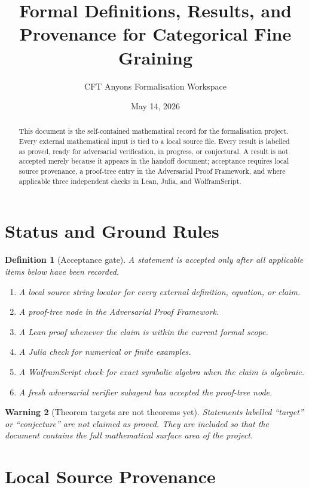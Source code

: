 \documentclass[11pt]{article}
\title{Formal Definitions, Results, and Provenance for Categorical Fine Graining}
\author{CFT Anyons Formalisation Workspace}
\date{May 14, 2026}
\newtheorem{definition}{Definition}[section]
\newtheorem{warning}[definition]{Warning}
\begin{document}
\maketitle

\begin{abstract}
This document is the self-contained mathematical record for the
formalisation project. Every external mathematical input is tied to a local
source file. Every result is labelled as proved, ready for adversarial
verification, in progress, or conjectural. A result is not accepted merely
because it appears in the handoff document; acceptance requires local source
provenance, a proof-tree entry in the Adversarial Proof Framework, and where
applicable three independent checks in Lean, Julia, and WolframScript.
\end{abstract}

\tableofcontents

\section{Status and Ground Rules}

\begin{definition}[Acceptance gate]
A statement is accepted only after all applicable items below have been
recorded.
\begin{enumerate}[label=\arabic*.]
\item A local source string locator for every external definition, equation,
or claim.
\item A proof-tree node in the Adversarial Proof Framework.
\item A Lean proof whenever the claim is within the current formal scope.
\item A Julia check for numerical or finite examples.
\item A WolframScript check for exact symbolic algebra when the claim is
algebraic.
\item A fresh adversarial verifier subagent has accepted the proof-tree node.
\end{enumerate}
\end{definition}

\begin{warning}[Theorem targets are not theorems yet]
Statements labelled ``target'' or ``conjecture'' are not claimed as proved.
They are included so that the document contains the full mathematical surface
area of the project.
\end{warning}

\section{Local Source Provenance}
\end{document}
